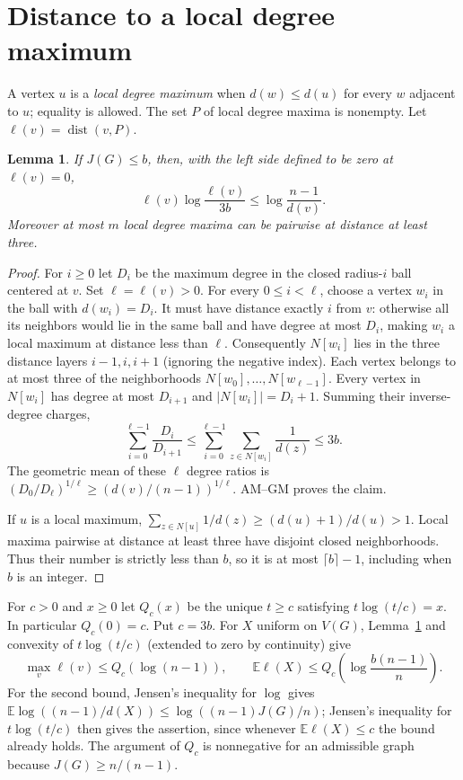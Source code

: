 \documentclass[11pt]{article}
\newtheorem{lemma}{Lemma}
\begin{document}
\section{Distance to a local degree maximum}
A vertex $u$ is a \emph{local degree maximum} when
$d(w)\le d(u)$ for every $w$ adjacent to $u$; equality is
allowed. The set $P$ of local degree maxima is nonempty.
Let $\ell(v)=\operatorname{dist}(v,P)$.

\begin{lemma}\label{lem:access}
If $J(G)\le b$, then, with the left side defined to be zero at
$\ell(v)=0$,
\[
\ell(v)\log\frac{\ell(v)}{3b}
 \le\log\frac{n-1}{d(v)}.
\]
Moreover at most $m$ local degree maxima can be pairwise
at distance at least three.
\end{lemma}

\begin{proof}
For $i\ge0$ let $D_i$ be the maximum degree in the closed
radius-$i$ ball centered at $v$. Set $\ell=\ell(v)>0$.
For every $0\le i<\ell$, choose a vertex $w_i$ in the
ball with $d(w_i)=D_i$. It must have distance exactly $i$
from $v$: otherwise all its neighbors would lie in the same
ball and have degree at most $D_i$, making $w_i$ a local
maximum at distance less than $\ell$.
Consequently $N[w_i]$ lies in the three distance layers
$i-1,i,i+1$ (ignoring the negative index).
Each vertex belongs to at most three of the neighborhoods
$N[w_0],\ldots,N[w_{\ell-1}]$.
Every vertex in $N[w_i]$ has degree at most $D_{i+1}$
and $|N[w_i]|=D_i+1$. Summing their inverse-degree charges,
\[
\sum_{i=0}^{\ell-1}\frac{D_i}{D_{i+1}}
 \le\sum_{i=0}^{\ell-1}\sum_{z\in N[w_i]}\frac1{d(z)}
 \le 3b.
\]
The geometric mean of these $\ell$ degree ratios is
$(D_0/D_{\ell})^{1/\ell}\ge(d(v)/(n-1))^{1/\ell}$.
AM--GM proves the claim.

If $u$ is a local maximum,
$\sum_{z\in N[u]}1/d(z)\ge(d(u)+1)/d(u)>1$.
Local maxima pairwise at distance at least three have
disjoint closed neighborhoods. Thus their number is strictly
less than $b$, so it is at most $\lceil b\rceil-1$,
including when $b$ is an integer.
\end{proof}

For $c>0$ and $x\ge0$ let $Q_c(x)$ be the unique $t\ge c$
satisfying $t\log(t/c)=x$. In particular
$Q_c(0)=c$. Put $c=3b$. For $X$ uniform on $V(G)$,
Lemma~\ref{lem:access} and convexity of $t\log(t/c)$
(extended to zero by continuity) give
\[
 \max_v\ell(v)\le Q_c(\log(n-1)),\qquad
 \mathbb E\ell(X)\le Q_c\!\left(\log\frac{b(n-1)}n\right).
\]
For the second bound, Jensen's inequality for $\log$
gives $\mathbb E\log((n-1)/d(X))\le\log((n-1)J(G)/n)$;
Jensen's inequality for $t\log(t/c)$ then gives the assertion,
since whenever $\mathbb E\ell(X)\le c$ the bound already holds.
The argument of $Q_c$ is nonnegative for an admissible graph
because $J(G)\ge n/(n-1)$.
\end{document}
